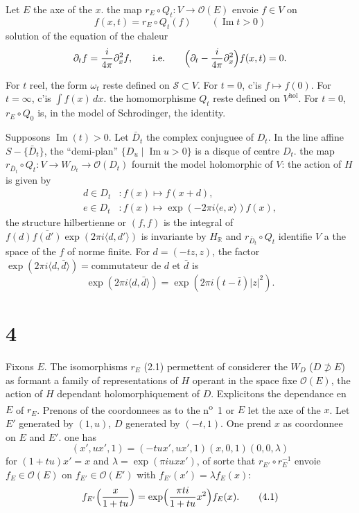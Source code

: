 \documentclass[12pt,a4paper]{article}
\theoremstyle{plain}
\theoremstyle{definition}
\theoremstyle{remark}
\DeclareMathOperator{\Impart}{Im}
\begin{document}
Let $E$ the axe of the $x$. the map $r_E \circ Q_t \colon V \to \mathcal{O}(E)$ envoie $f \in V$ on
\[f(x, t) = r_E \circ Q_t(f) \qquad (\Impart t > 0)\]
solution of the equation of the chaleur
\[\partial_t f = \frac{i}{4\pi}\partial_x^2 f, \qquad \text{i.e.} \qquad \Bigl(\partial_t - \frac{i}{4\pi}\partial_x^2\Bigr)f(x, t) = 0.\]

For $t$ reel, the form $\omega_t$ reste defined on $\mathcal{S} \subset V$. For $t = 0$, c'is $f \mapsto f(0)$. For $t = \infty$, c'is $\int f(x)\,dx$. the homomorphisme $Q_t$ reste defined on $V^{\mathrm{hol}}$. For $t = 0$, $r_E \circ Q_0$ is, in the model of Schrodinger, the identity.

Supposons $\Impart(t) > 0$. Let $\bar{D}_t$ the complex conjuguee of $D_t$. In the line affine $S - \{\bar{D}_t\}$, the ``demi-plan'' $\{D_u \mid \Impart u > 0\}$ is a disque of centre $D_t$. the map $r_{\bar{D}_t} \circ Q_t \colon V \to W_{D_t} \to \mathcal{O}(D_t)$ fournit the model holomorphic of $V$: the action of $H$ is given by
\begin{align*}
d \in D_t &\colon f(x) \mapsto f(x + d), \\
e \in D_t &\colon f(x) \mapsto \exp(-2\pi i\langle e, x \rangle)f(x),\tag{3.1}
\end{align*}
the structure hilbertienne or $(f, f)$ is the integral of $f(d)\overline{f(d')}\exp(2\pi i\langle d, d' \rangle)$ is invariante by $H_\mathbb{R}$ and $r_{\bar{D}_t} \circ Q_t$ identifie $V$ a the space of the $f$ of norme finite. For $d = (-tz, z)$, the factor $\exp(2\pi i\langle d, \bar{d} \rangle) = \text{commutateur de } d \text{ et } \bar{d}$ is
\[\exp(2\pi i\langle d, \bar{d} \rangle) = \exp(2\pi i(t - \bar{t})|z|^2).\]

\section*{4}

Fixons $E$. The isomorphisms $r_E$ (2.1) permettent of considerer the $W_D$ ($D \not\supset E$) as formant a family of representations of $H$ operant in the space fixe $\mathcal{O}(E)$, the action of $H$ dependant holomorphiquement of $D$. Explicitons the dependance en $E$ of $r_E$. Prenons of the coordonnees as to the n\textsuperscript{o}~1 or $E$ let the axe of the $x$. Let $E'$ generated by $(1, u)$, $D$ generated by $(-t, 1)$. One prend $x$ as coordonnee on $E$ and $E'$. one has
\[(x', ux', 1) = (-tux', ux', 1)(x, 0, 1)(0, 0, \lambda)\]
for $(1 + tu)x' = x$ and $\lambda = \exp(\pi i uxx')$, of sorte that $r_{E'} \circ r_E^{-1}$ envoie $f_E \in \mathcal{O}(E)$ on $f_{E'} \in \mathcal{O}(E')$ with $f_{E'}(x') = \lambda f_E(x)$:
\begin{equation}\label{eq:4.1}
f_{E'}\Bigl(\frac{x}{1 + tu}\Bigr) = \exp\Bigl(\frac{\pi ti}{1 + tu}x^2\Bigr)f_E(x).\tag{4.1}
\end{equation}
\end{document}
